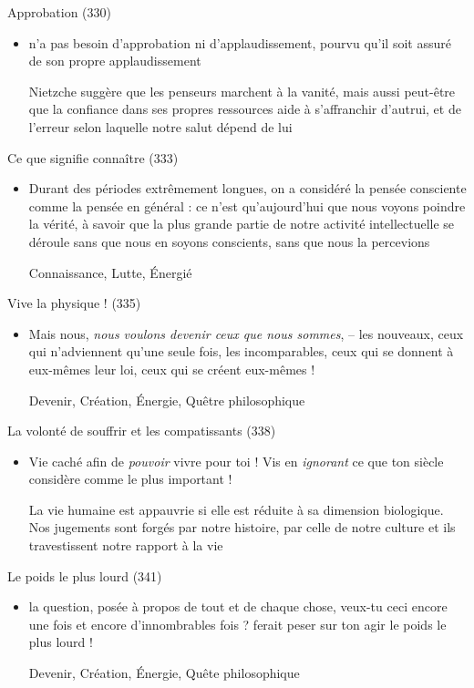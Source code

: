 \documentclass[french,a4paper,11pt,answers]{exam}
\newcommand{\cit}[2]{\og #1 \fg{} \begin{solution}{ #2 }\end{solution}} %
\begin{document}
	\begin{cadre}{Approbation (330)}
		\begin{itemize}
			\item \cit{[le penseur] n'a pas besoin d'approbation ni d'applaudissement, pourvu qu'il soit assuré de son propre applaudissement}
				{Nietzche suggère que les penseurs marchent à la vanité, mais aussi peut-être que la confiance dans ses propres ressources aide à s'affranchir d'autrui, et de l'erreur selon laquelle notre salut dépend de lui}
		\end{itemize}
	\end{cadre}
	
	\begin{cadre}{Ce que signifie connaître (333)}
		\begin{itemize}
			\item \cit{Durant des périodes extrêmement longues, on a considéré la pensée consciente comme la pensée en général : ce n'est qu'aujourd'hui que nous voyons poindre la vérité, à savoir que la plus grande partie de notre activité intellectuelle se déroule sans que nous en soyons conscients, sans que nous la percevions}
				{Connaissance, Lutte, Énergié} %
		\end{itemize}
	\end{cadre}

	\begin{cadre}{Vive la physique ! (335)}
		\begin{itemize}
			\item \cit{Mais nous, \emph{nous voulons devenir ceux que nous sommes}, -- les nouveaux, ceux qui n'adviennent qu'une seule fois, les incomparables, ceux qui se donnent à eux-mêmes leur loi, ceux qui se créent eux-mêmes !}
				{Devenir, Création, Énergie, Quêtre philosophique}
		\end{itemize}
	\end{cadre}

	\begin{cadre}{La volonté de souffrir et les compatissants (338)}
		\begin{itemize}
			\item \cit{Vie caché afin de \emph{pouvoir} vivre pour toi ! Vis en \emph{ignorant} ce que ton siècle considère comme le plus important !}
				{La vie humaine est appauvrie si elle est réduite à sa dimension biologique. Nos jugements sont forgés par notre histoire, par celle de notre culture et ils travestissent notre rapport à la vie}
		\end{itemize}
	\end{cadre}
	
	\begin{cadre}{Le poids le plus lourd (341)}
		\begin{itemize}
			\item \cit{la question, posée à propos de tout et de chaque chose, \og veux-tu ceci encore une fois et encore d'innombrables fois ? \fg{} ferait peser sur ton agir le poids le plus lourd !}
				{Devenir, Création, Énergie, Quête philosophique}
		\end{itemize}
	\end{cadre}
\end{document}
